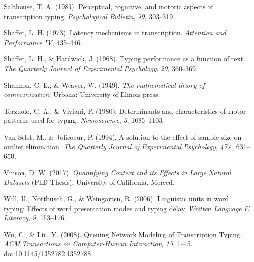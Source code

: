 \documentclass[,man,floatsintext]{apa6}
\begin{document}
\leavevmode\hypertarget{ref-salthouse_perceptual_1986}{}%
Salthouse, T. A. (1986). Perceptual, cognitive, and motoric aspects of transcription typing. \emph{Psychological Bulletin}, \emph{99}, 303--319.

\leavevmode\hypertarget{ref-shaffer_latency_1973}{}%
Shaffer, L. H. (1973). Latency mechanisms in transcription. \emph{Attention and Performance IV}, 435--446.

\leavevmode\hypertarget{ref-shaffer_typing_1968}{}%
Shaffer, L. H., \& Hardwick, J. (1968). Typing performance as a function of text. \emph{The Quarterly Journal of Experimental Psychology}, \emph{20}, 360--369.

\leavevmode\hypertarget{ref-Shannonmathematicaltheorycommunication1949}{}%
Shannon, C. E., \& Weaver, W. (1949). \emph{The mathematical theory of communication}. Urbana: University of Illinois press.

\leavevmode\hypertarget{ref-terzuolo_determinants_1980}{}%
Terzuolo, C. A., \& Viviani, P. (1980). Determinants and characteristics of motor patterns used for typing. \emph{Neuroscience}, \emph{5}, 1085--1103.

\leavevmode\hypertarget{ref-van_selst_solution_1994}{}%
Van Selst, M., \& Jolicoeur, P. (1994). A solution to the effect of sample size on outlier elimination. \emph{The Quarterly Journal of Experimental Psychology}, \emph{47A}, 631--650.

\leavevmode\hypertarget{ref-vinson_quantifying_2017}{}%
Vinson, D. W. (2017). \emph{Quantifying Context and its Effects in Large Natural Datasets} (PhD Thesis). University of California, Merced.

\leavevmode\hypertarget{ref-will_linguistic_2006}{}%
Will, U., Nottbusch, G., \& Weingarten, R. (2006). Linguistic units in word typing: Effects of word presentation modes and typing delay. \emph{Written Language \& Literacy}, \emph{9}, 153--176.

\leavevmode\hypertarget{ref-wu_queuing_2008}{}%
Wu, C., \& Liu, Y. (2008). Queuing Network Modeling of Transcription Typing. \emph{ACM Transactions on Computer-Human Interaction}, \emph{15}, 1--45. doi:\href{https://doi.org/10.1145/1352782.1352788}{10.1145/1352782.1352788}

\endgroup
\end{document}
